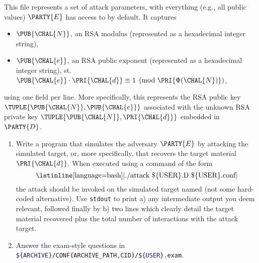 
This file represents a set of attack parameters, with everything (e.g.,
all public values) $\PARTY{E}$ has access to by default.  It captures

\begin{itemize}
\item $\PUB{\CHAL{N}}$,     
      an RSA        modulus
      (represented as a                   hexadecimal integer string),
\item $\PUB{\CHAL{e}}$,
      an RSA        public exponent
      (represented as a                   hexadecimal integer string),
      st. $\PUB{\CHAL{e}} \cdot \PRI{\CHAL{d}} \equiv 1 \pmod{\PRI{\Phi{(\CHAL{N})}}}$,
\end{itemize}

\noindent
using one field per line.
More specifically, this represents the RSA public key 
$
\TUPLE{ \PUB{\CHAL{N}}, \PUB{\CHAL{e}} }
$
associated with the unknown RSA private key 
$
\TUPLE{ \PUB{\CHAL{N}}, \PRI{\CHAL{d}} } 
$
embedded in $\PARTY{D}$.



\begin{enumerate}
\item Write a program that simulates the adversary $\PARTY{E}$ by attacking
      the simulated target, or, more specifically, that recovers the target 
      material $\PRI{\CHAL{d}}$.  
      When executed using a command of the form
      \[
      \mbox{\lstinline[language={bash}]|./attack \$\{USER\}.D \$\{USER\}.conf|}
      \]
      the attack should be invoked on the simulated target named (not some
      hard-coded alternative).  Use \lstinline[language={bash}]{stdout} to 
      print 
      a) any intermediate output you deem relevant, followed finally by 
      b) two lines which clearly detail the target material recovered plus
         the total number of interactions with the attack target.
\item Answer the exam-style questions in 
      \lstinline[language={bash}]|${ARCHIVE}/CONF(ARCHIVE_PATH,CID)/${USER}.exam|.
\end{enumerate}

